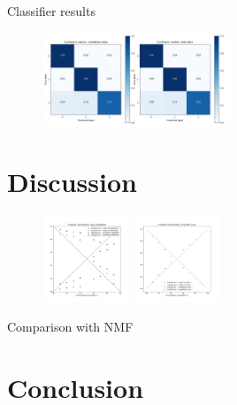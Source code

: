 \documentclass{article}
\begin{document}
Classifier results


\begin{figure}
  
  \includegraphics[width=0.5\textwidth]{figures/raman_sim_3_conf_matrix13.png}

\end{figure}

\section{Discussion}
\label{sec:discussion}


\begin{figure}
  \includegraphics[width=0.23\textwidth]{figures/DNN_pred_conc_prob.png}
  \includegraphics[width=0.23\textwidth]{figures/nmf_pred_conc.png}
\end{figure}

Comparison with NMF

\section{Conclusion}
\label{ssec:conclusion}



\vfill
\pagebreak
\end{document}
